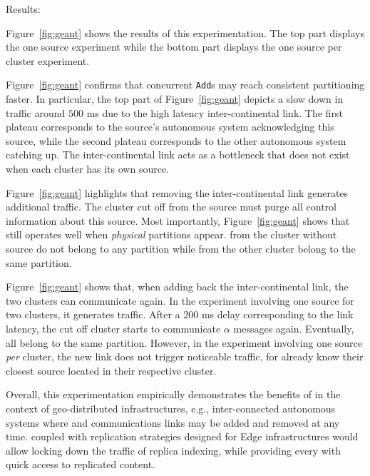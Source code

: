 \begin{asparadesc}
\item [Results:]

Figure~\ref{fig:geant} shows the results of this experimentation. The
top part displays the one source experiment while the bottom part
displays the one source per cluster experiment.

\noindent Figure~\ref{fig:geant} confirms that concurrent
\texttt{Add}s may reach consistent partitioning faster. In particular,
the top part of Figure~\ref{fig:geant} depicts a slow down in traffic
around $500$ ms due to the high latency inter-continental link. The
first plateau corresponds to the source's autonomous system
acknowledging this source, while the second plateau corresponds to the
other autonomous system catching up.  The inter-continental link acts
as a bottleneck that does not exist when each cluster has its own
source.

\noindent Figure~\ref{fig:geant} highlights that removing the
inter-continental link generates additional traffic. The cluster cut
off from the source must purge all control information about this
source.  Most importantly, Figure~\ref{fig:geant} shows that \NAME
still operates well when \emph{physical} partitions appear. \Processes
from the cluster without source do not belong to any partition while
\processes from the other cluster belong to the same partition. 

\noindent Figure~\ref{fig:geant} shows that, when adding back the
inter-continental link, the two clusters can communicate again. In the
experiment involving one source for two clusters, it generates
traffic. After a $200$ ms delay corresponding to the link latency, the
cut off cluster starts to communicate $\alpha$ messages
again. Eventually, all \processes belong to the same
partition. However, in the experiment involving one source \emph{per}
cluster, the new link does not trigger noticeable traffic, for
\processes already know their closest source located in their
respective cluster.

\noindent Overall, this experimentation empirically demonstrates the
benefits of \NAME in the context of geo-distributed infrastructures,
e.g., inter-connected autonomous systems where \processes and
communications links may be added and removed at any time. \NAME
coupled with replication strategies designed for Edge infrastructures
would allow locking down the traffic of replica indexing, while
providing every \process with quick access to replicated content.

\end{asparadesc}


